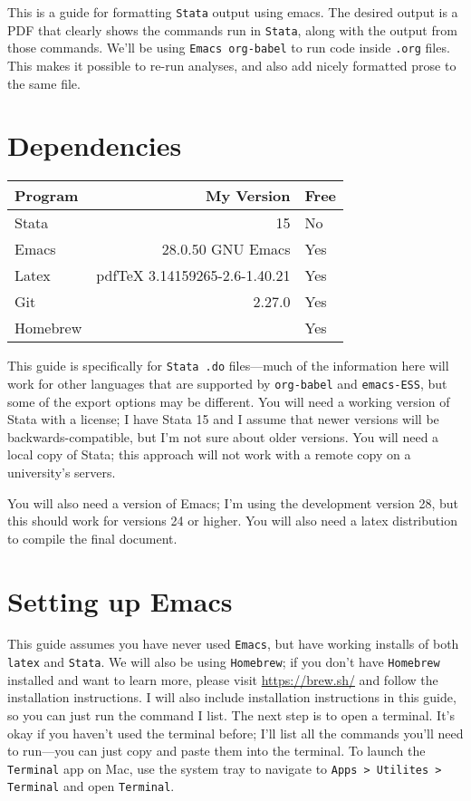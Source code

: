 \documentclass[a4paper]{article}
\date{\today}
\title{}
\begin{document}
\tableofcontents

\begin{ABSTRACT}
This is a guide for formatting \texttt{Stata} output using emacs. The desired output is a PDF that clearly shows the commands run in \texttt{Stata}, along with the output from those commands. We'll be using \texttt{Emacs org-babel} to run code inside \texttt{.org} files. This makes it possible to re-run analyses, and also add nicely formatted prose to the same file. 
\end{ABSTRACT}

\section{Dependencies}
\label{sec:org452a58b}
\begin{center}
\begin{tabular}{lrl}
Program & My Version & Free\\
\hline
Stata & 15 & No\\
Emacs & 28.0.50 GNU Emacs & Yes\\
Latex & pdfTeX 3.14159265-2.6-1.40.21 & Yes\\
Git & 2.27.0 & Yes\\
Homebrew &  & Yes\\
\end{tabular}
\end{center}

This guide is specifically for \texttt{Stata .do} files---much of the information here will work for other languages that are supported by \texttt{org-babel} and \texttt{emacs-ESS}, but some of the export options may be different. You will need a working version of Stata with a license; I have Stata 15 and I assume that newer versions will be backwards-compatible, but I'm not sure about older versions. You will need a local copy of Stata; this approach will not work with a remote copy on a university's servers. 

You will also need a version of Emacs; I'm using the development version 28, but this should work for versions 24 or higher. You will also need a latex distribution to compile the final document. 

\section{Setting up Emacs}
\label{sec:org759a64c}
This guide assumes you have never used \texttt{Emacs}, but have working installs of both \texttt{latex} and \texttt{Stata}. We will also be using \texttt{Homebrew}; if you don't have \texttt{Homebrew} installed and want to learn more, please visit \url{https://brew.sh/} and follow the installation instructions. I will also include installation instructions in this guide, so you can just run the command I list. The next step is to open a terminal. It's okay if you haven't used the terminal before; I'll list all the commands you'll need to run---you can just copy and paste them into the terminal. To launch the \texttt{Terminal} app on Mac, use the system tray to navigate to \texttt{Apps > Utilites > Terminal} and open \texttt{Terminal}.
\end{document}
